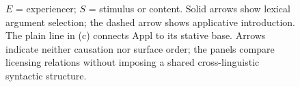 \begin{figure}[!ht]
\par\smallskip
\parbox{\textwidth}{\footnotesize
$E$ = experiencer; $S$ = stimulus or content. Solid arrows show lexical
argument selection; the dashed arrow shows applicative introduction.
The plain line in (c) connects Appl to its stative base. Arrows indicate
neither causation nor surface order; the panels compare licensing relations
without imposing a shared cross-linguistic syntactic structure.}
\end{figure}

